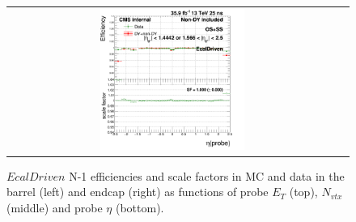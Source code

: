 \begin{figure}[bh]
\begin{center}
\begin{tabular}{cc}
      \includegraphics[width=0.45\textwidth]{figures/Zprime/2016/ScaleFactor/SameSign/N_1_eff/g_compare_cut_eta_Barrel+Endcap_ea_ta_inc_AS_N_1_EcalDriven_PUW.png}
    \end{tabular}
    \caption{$EcalDriven$ N-1 efficiencies and scale factors in MC and data in the barrel (left) and endcap (right) as functions of probe $E_T$ (top), $N_{vtx}$ (middle) and probe $\eta$ (bottom).}
    \label{fig:EcalDriven_2016}
  \end{center}
\end{figure}

